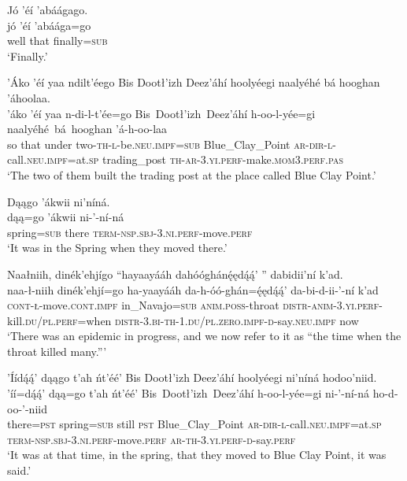 \ea\label{ex:text1-9-4}
Jó ’éí ’abáágago.\\
\gll jó	’éí	’abáága=go\\
     well	that	finally=\textsc{sub}\\
\glt `Finally.'
\z

\ea\label{ex:text1-9-5}
’Áko ’éí yaa ndilt’éego Bis Dootł’izh Deez’áhí hoolyéegi naalyéhé bá hooghan ’áhoolaa.\\
\gll ’áko	’éí	yaa	n-di-l-t’ée=go	Bis~Dootł’izh~{Deez’áhí}	h-oo-l-yée=gi	naalyéhé~bá~{hooghan}	’á-h-oo-laa\\
     so	that	under	two-\textsc{th}-\textsc{l}-be.\textsc{neu}.\textsc{impf}=\textsc{sub}	Blue\_Clay\_Point	\textsc{ar}-\textsc{dir}-\textsc{l}-call.\textsc{neu}.\textsc{impf}=at.\textsc{sp}	trading\_post	\textsc{th}-\textsc{ar}-3.\textsc{yi}.\textsc{perf}-make.\textsc{mom}3.\textsc{perf}.\textsc{pas}\\
\glt `The two of them built the trading post at the place called Blue Clay Point.'
\z

\ea\label{ex:text1-9-6}
Dąągo ’ákwii ni’níná.\\
\gll dąą=go	’ákwii	ni-’-ní-ná\\
     spring=\textsc{sub}	there	\textsc{term}-\textsc{nsp}.\textsc{sbj}-3.\textsc{ni}.\textsc{perf}-move.\textsc{perf}\\
\glt `It was in the Spring when they moved there.'
\z

\largerpage
\ea\label{ex:text1-9-7}
Naałniih, dinék’ehjígo ``hayaayááh dahóóghánę́ędą́ą́’ '' dabidii’ní k’ad.\\
\gll naa-ł-niih	dinék’ehjí=go	ha-yaayááh	da-h-óó-ghán=ę́ędą́ą́’	da-bi-d-ii-’-ní	k’ad\\
     \textsc{cont}-\textsc{ł}-move.\textsc{cont}.\textsc{impf}	in\_Navajo=\textsc{sub}	\textsc{anim}.\textsc{poss}-throat	\textsc{distr}-\textsc{anim}-3.\textsc{yi}.\textsc{perf}-kill.\textsc{du}/\textsc{pl}.\textsc{perf}=when	\textsc{distr}-3.\textsc{bi}-\textsc{th}-1.\textsc{du}/\textsc{pl}.\textsc{zero}.\textsc{impf}-\textsc{d}-say.\textsc{neu}.\textsc{impf}	now\\
\glt `There was an epidemic in progress, and we now refer to it as ``the time when the throat killed many.'''
\z

\ea\label{ex:text1-9-8}
’Íídą́ą́’ dąągo t’ah ńt’éé’ Bis Dootł’izh Deez’áhí hoolyéegi ni’níná hodoo’niid.\\
\gll ’íí=dą́ą́’	dąą=go	t’ah	ńt’éé’	Bis~Dootł’izh~{Deez’áhí}	h-oo-l-yée=gi	ni-’-ní-ná	ho-d-oo-’-niid\\
     there=\textsc{pst}	spring=\textsc{sub}	still	\textsc{pst}	Blue\_Clay\_Point	\textsc{ar}-\textsc{dir}-\textsc{l}-call.\textsc{neu}.\textsc{impf}=at.\textsc{sp}	\textsc{term}-\textsc{nsp}.\textsc{sbj}-3.\textsc{ni}.\textsc{perf}-move.\textsc{perf}	\textsc{ar}-\textsc{th}-3.\textsc{yi}.\textsc{perf}-\textsc{d}-say.\textsc{perf}\\
\glt `It was at that time, in the spring, that they moved to Blue Clay Point, it was said.'
\z

